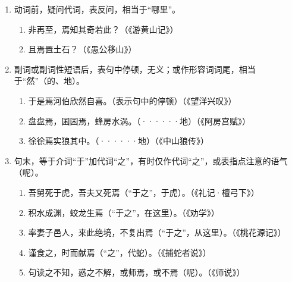 \noindent
[\ 焉\ ]
\begin{enumerate}[label=(\arabic*)]
	\item 动词前，疑问代词，表反问，相当于“哪里”。
	\begin{enumerate}[label=\textcircled{\arabic*}]
		\item 非再至，焉知其奇若此？（《游黄山记》）
		\item 且焉置土石？（《愚公移山》）
	\end{enumerate}
	\item 副词或副词性短语后，表句中停顿，无义；或作形容词词尾，相当于“然”（的、地）。
	\begin{enumerate}[label=\textcircled{\arabic*}]
		\item 于是焉河伯欣然自喜。（表示句中的停顿）（《望洋兴叹》）
		\item 盘盘焉，囷囷焉，蜂房水涡。（······地）（《阿房宫赋》）
		\item 徐徐焉实狼其中。（······地）（《中山狼传》）
	\end{enumerate}
	\item 句末，等于介词“于”加代词“之”，有时仅作代词“之”，或表指点注意的语气（呢）。
	\begin{enumerate}[label=\textcircled{\arabic*}]
		\item 吾舅死于虎，吾夫又死焉（“于之”，于虎）。（《礼记·檀弓下》）
		\item 积水成渊，蛟龙生焉（“于之”，在这里）。（《劝学》）
		\item 率妻子邑人，来此绝境，不复出焉（“于之”，从这里）。（《桃花源记》）
		\item 谨食之，时而献焉（“之”，代蛇）。（《捕蛇者说》）
		\item 句读之不知，惑之不解，或师焉，或不焉（呢）。（《师说》）
	\end{enumerate}
\end{enumerate}

